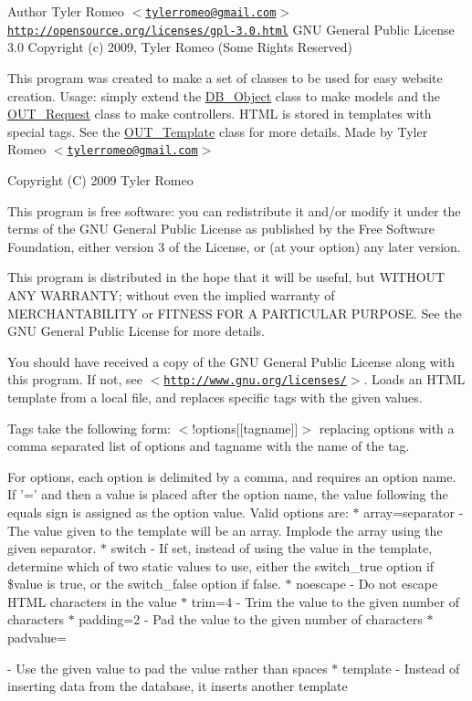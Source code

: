 \begin{DoxyAuthor}{Author}
Tyler Romeo $<$\href{mailto:tylerromeo@gmail.com}{\tt tylerromeo@gmail.com}$>$  \href{http://opensource.org/licenses/gpl-3.0.html}{\tt http://opensource.org/licenses/gpl-\/3.0.html} GNU General Public License 3.0  Copyright (c) 2009, Tyler Romeo (Some Rights Reserved)
\end{DoxyAuthor}
This program was created to make a set of classes to be used for easy website creation. Usage: simply extend the \hyperlink{classDB__Object}{DB\_\-Object} class to make models and the \hyperlink{classOUT__Request}{OUT\_\-Request} class to make controllers. HTML is stored in templates with special tags. See the \hyperlink{classOUT__Template}{OUT\_\-Template} class for more details. Made by Tyler Romeo $<$\href{mailto:tylerromeo@gmail.com}{\tt tylerromeo@gmail.com}$>$

Copyright (C) 2009 Tyler Romeo

This program is free software: you can redistribute it and/or modify it under the terms of the GNU General Public License as published by the Free Software Foundation, either version 3 of the License, or (at your option) any later version.

This program is distributed in the hope that it will be useful, but WITHOUT ANY WARRANTY; without even the implied warranty of MERCHANTABILITY or FITNESS FOR A PARTICULAR PURPOSE. See the GNU General Public License for more details.

You should have received a copy of the GNU General Public License along with this program. If not, see $<$\href{http://www.gnu.org/licenses/}{\tt http://www.gnu.org/licenses/}$>$. Loads an HTML template from a local file, and replaces specific tags with the given values.

Tags take the following form: $<$!options\mbox{[}\mbox{[}tagname\mbox{]}\mbox{]}$>$ replacing options with a comma separated list of options and tagname with the name of the tag.

For options, each option is delimited by a comma, and requires an option name. If '=' and then a value is placed after the option name, the value following the equals sign is assigned as the option value. Valid options are: $\ast$ array=separator -\/ The value given to the template will be an array. Implode the array using the given separator. $\ast$ switch -\/ If set, instead of using the value in the template, determine which of two static values to use, either the switch\_\-true option if \$value is true, or the switch\_\-false option if false. $\ast$ noescape -\/ Do not escape HTML characters in the value $\ast$ trim=4 -\/ Trim the value to the given number of characters $\ast$ padding=2 -\/ Pad the value to the given number of characters $\ast$ padvalue=\par
 -\/ Use the given value to pad the value rather than spaces $\ast$ template -\/ Instead of inserting data from the database, it inserts another template

